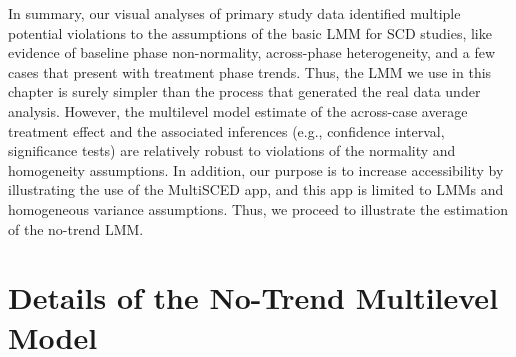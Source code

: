 \documentclass[
]{book}
\begin{document}
In summary, our visual analyses of primary study data identified multiple potential violations to the assumptions of the basic LMM for SCD studies, like evidence of baseline phase non-normality, across-phase heterogeneity, and a few cases that present with treatment phase trends. Thus, the LMM we use in this chapter is surely simpler than the process that generated the real data under analysis. However, the multilevel model estimate of the across-case average treatment effect and the associated inferences (e.g., confidence interval, significance tests) are relatively robust to violations of the normality and homogeneity assumptions. In addition, our purpose is to increase accessibility by illustrating the use of the MultiSCED app, and this app is limited to LMMs and homogeneous variance assumptions. Thus, we proceed to illustrate the estimation of the no-trend LMM.

\hypertarget{details-of-the-no-trend-multilevel-model}{%
\section{Details of the No-Trend Multilevel Model}\label{details-of-the-no-trend-multilevel-model}}
\end{document}
